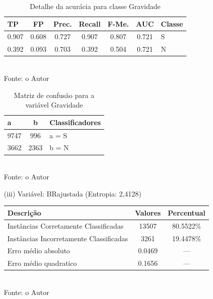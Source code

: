 \begin{enumerate}
\pagebreak	
	
	\begin{table}[!ht]
		\centering
		\caption{Detalhe da acurácia para classe Gravidade}
		\vspace{1mm}
		\begin{tabular}{l|c|c|c|c|c|l}
			\hline
			\textbf{TP} & \textbf{FP} & \textbf{Prec.} & \textbf{Recall} & \textbf{F-Me.} & \textbf{AUC} & \textbf{Classe} \\
			\hline
			0.907 & 0.608 & 0.727 & 0.907 & 0.807 & 0.721 & S \\
			0.392 & 0.093 & 0.703 & 0.392 & 0.504 & 0.721 & N \\
				
		\end{tabular}
		\\
		\tiny Fonte: o Autor
	\end{table}
	
	\begin{table}[!ht]
		\centering
		\caption{Matriz de confusão para a variável Gravidade}
		\vspace{1mm}
		\begin{tabular}{l|c|l}
			\hline
			\textbf{a} & \textbf{b} & \textbf{Classificadores}\\
			\hline
			9747 & 996 & a = S \\
			3662 & 2363 & b = N \\
		\end{tabular}
		\\
		\tiny Fonte: o Autor
	\end{table}
	
	
	\item[(iii)] Variável: BRajustada (Entropia: 2,4128)
	\begin{table}[!ht]
		\centering
		\vspace{1mm}
		\begin{tabular}{l|c|c}
			\hline
			\textbf{Descrição} & \textbf{Valores} & \textbf{Percentual} \\
			\hline
			Instâncias Corretamente Classificadas & 13507 & 80.5522\% \\
			Instâncias Incorretamente Classificadas & 3261 & 19.4478\% \\
			Erro médio absoluto & 0.0469 & ---  \\
			Erro médio quadratico & 0.1656 & --- \\
		\end{tabular}
		\\
		\tiny Fonte: o Autor
	\end{table}
	

\end{enumerate}
